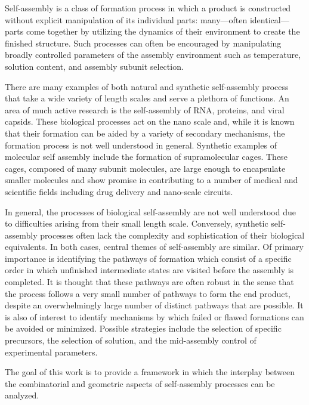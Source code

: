 

Self-assembly is a class of formation process in which a product is constructed without explicit manipulation of its individual parts: many---often identical---parts come together by utilizing the dynamics of their environment to create the finished structure. Such processes can often be encouraged by manipulating broadly controlled parameters of the assembly environment such as temperature, solution content, and assembly subunit selection. 

There are many examples of both natural and synthetic self-assembly process that take a wide variety of length scales and serve a plethora of functions. An area of much active research is the self-assembly of RNA, proteins, and viral capsids. These biological processes act on the nano scale and, while it is known that their formation can be aided by a variety of secondary mechanisms, the formation process is not well understood in general. Synthetic examples of molecular self assembly include the formation of supramolecular cages. These cages, composed of many subunit molecules, are large enough to encapsulate smaller molecules and show promise in contributing to a number of medical and scientific fields including drug delivery and nano-scale circuits. 

In general, the processes of biological self-assembly are not well understood due to difficulties arising from their small length scale. Conversely, synthetic self-assembly processes often lack the complexity and sophistication of their biological equivalents. In both cases, central themes of self-assembly are similar. Of primary importance is identifying the pathways of formation which consist of a specific order in which unfinished intermediate states are visited before the assembly is completed. It is thought that these pathways are often robust in the sense that the process follows a very small number of pathways to form the end product, despite an overwhelmingly large number of distinct pathways that are possible. It is also of interest to identify mechanisms by which failed or flawed formations can be avoided or minimized. Possible strategies include the selection of specific precursors, the selection of solution, and the mid-assembly control of experimental parameters. 

The goal of this work is to provide a framework in which the interplay between the combinatorial and geometric aspects of self-assembly processes can be analyzed. 

